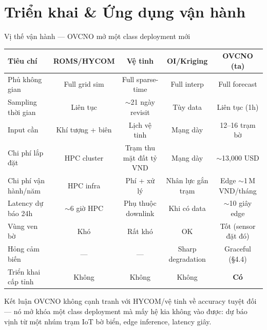 \documentclass[11pt,aspectratio=169]{beamer}
\begin{document}
\section{Triển khai \& Ứng dụng vận hành}

\begin{frame}{Vị thế vận hành --- OVCNO mở một class deployment mới}
  \scriptsize \centering
  \begin{tabular}{@{}l c c c c@{}}
    \toprule
    \textbf{Tiêu chí} & \textbf{ROMS/HYCOM} & \textbf{Vệ tinh} & \textbf{OI/Kriging} & \alert{\textbf{OVCNO (ta)}} \\
    \midrule
    Phủ không gian        & Full grid sim & Full sparse-time & Full interp & Full forecast \\
    \alert{Sampling thời gian}    & Liên tục & \alert{$\sim$21 ngày revisit} & Tùy data & \alert{Liên tục (1h)} \\
    Input cần              & Khí tượng + biên & Lịch vệ tinh & Mạng dày & \alert{12--16 trạm bờ} \\
    \alert{Chi phí lắp đặt}        & HPC cluster & Trạm thu mặt đất tỷ VND & Mạng dày & \alert{$\sim$13{,}000 USD} \\
    Chi phí vận hành/năm   & HPC infra & Phí + xử lý & Nhân lực gắn trạm & Edge $\sim$1\,M VND/tháng \\
    \alert{Latency dự báo 24h}    & \alert{$\sim$6 giờ} HPC & Phụ thuộc downlink & Khi có data & \alert{$\sim$10 giây} edge \\
    Vùng ven bờ            & Khó & \alert{Rất khó} & OK & Tốt (sensor đặt đó) \\
    Hỏng cảm biến          & --- & --- & Sharp degradation & Graceful (\S 4.4) \\
    \alert{Triển khai cấp tỉnh}   & Không & Không & Không & \alert{\textbf{Có}} \\
    \bottomrule
  \end{tabular}

  \vspace{8pt}
  \begin{block}{Kết luận}
    OVCNO \alert{không cạnh tranh} với HYCOM/vệ tinh về accuracy tuyệt đối ---
    nó \alert{mở khóa} một class deployment mà mấy hệ kia không vào được:
    \alert{dự báo vịnh từ một nhúm trạm IoT bờ biển, edge inference, latency giây}.
  \end{block}
\end{frame}
\end{document}
